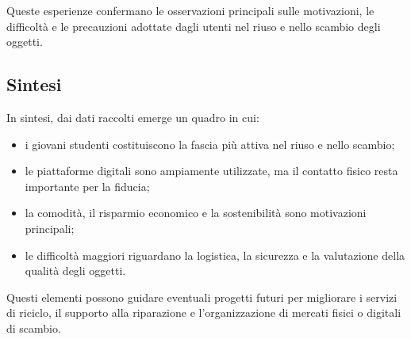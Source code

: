 \documentclass[12pt,a4paper]{article}
\begin{document}
Queste esperienze confermano le osservazioni principali sulle motivazioni, le difficoltà e le precauzioni adottate dagli utenti nel riuso e nello scambio degli oggetti.  

\subsection{Sintesi}

In sintesi, dai dati raccolti emerge un quadro in cui:  
\begin{itemize}
    \item i giovani studenti costituiscono la fascia più attiva nel riuso e nello scambio;  
    \item le piattaforme digitali sono ampiamente utilizzate, ma il contatto fisico resta importante per la fiducia;  
    \item la comodità, il risparmio economico e la sostenibilità sono motivazioni principali;  
    \item le difficoltà maggiori riguardano la logistica, la sicurezza e la valutazione della qualità degli oggetti.  
\end{itemize}
Questi elementi possono guidare eventuali progetti futuri per migliorare i servizi di riciclo, il supporto alla riparazione e l’organizzazione di mercati fisici o digitali di scambio.  
\end{document}
